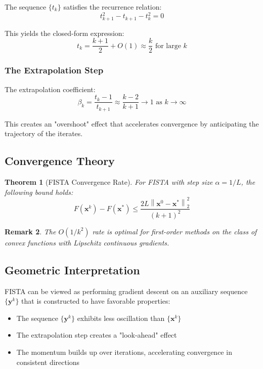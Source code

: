 \documentclass[12pt]{article}
\renewcommand{\vec}[1]{\mathbf{#1}}
\newcommand{\norm}[1]{\left\lVert#1\right\rVert}
\newtheorem{theorem}{Theorem}[section]
\newtheorem{remark}[theorem]{Remark}
\begin{document}
The sequence $\{t_k\}$ satisfies the recurrence relation:
\begin{equation}
    t_{k+1}^2 - t_{k+1} - t_k^2 = 0
\end{equation}

This yields the closed-form expression:
\begin{equation}
    t_k = \frac{k + 1}{2} + O(1) \approx \frac{k}{2} \text{ for large } k
\end{equation}

\subsubsection{The Extrapolation Step}

The extrapolation coefficient:
\begin{equation}
    \beta_k = \frac{t_k - 1}{t_{k+1}} \approx \frac{k-2}{k+1} \to 1 \text{ as } k \to \infty
\end{equation}

This creates an "overshoot" effect that accelerates convergence by anticipating the trajectory of the iterates.

\subsection{Convergence Theory}

\begin{theorem}[FISTA Convergence Rate]\label{thm:fista-convergence}
    For FISTA with step size $\alpha = 1/L$, the following bound holds:
    \begin{equation}
        F(\vec{x}^k) - F(\vec{x}^*) \leq \frac{2L\norm{\vec{x}^0 - \vec{x}^*}_2^2}{(k+1)^2}
    \end{equation}
\end{theorem}

\begin{remark}
    The $O(1/k^2)$ rate is optimal for first-order methods on the class of convex functions with Lipschitz continuous gradients.
\end{remark}

\subsection{Geometric Interpretation}

FISTA can be viewed as performing gradient descent on an auxiliary sequence $\{\vec{y}^k\}$ that is constructed to have favorable properties:
\begin{itemize}
    \item The sequence $\{\vec{y}^k\}$ exhibits less oscillation than $\{\vec{x}^k\}$
    \item The extrapolation step creates a "look-ahead" effect
    \item The momentum builds up over iterations, accelerating convergence in consistent directions
\end{itemize}
\end{document}

